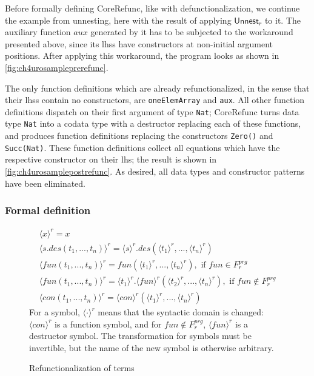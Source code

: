 Before formally defining \textsf{CoreRefunc}, like with defunctionalization, we continue the example from unnesting, here with the result of applying $\textsf{Unnest}_r$ to it. The auxiliary function $aux$ generated by it has to be subjected to the workaround presented above, since its lhss have constructors at non-initial argument positions. After applying this workaround, the program looks as shown in \autoref{fig:ch4urosampleprerefunc}.

The only function definitions which are already refunctionalized, in the sense that their lhss contain no constructors, are \texttt{oneElemArray} and \texttt{aux}. All other function definitions dispatch on their first argument of type \texttt{Nat}; \textsf{CoreRefunc} turns data type \texttt{Nat} into a codata type with a destructor replacing each of these functions, and produces function definitions replacing the constructors \texttt{Zero()} and \texttt{Succ(Nat)}. These function definitions collect all equations which have the respective constructor on their lhs; the result is shown in \autoref{fig:ch4urosamplepostrefunc}. As desired, all data types and constructor patterns have been eliminated.

\subsubsection{Formal definition}

\begin{figure}
\begin{align*}
\langle x \rangle^r = x \\
\langle s.des(t_1, ..., t_n) \rangle^r = \langle s \rangle^r .des(\langle t_1 \rangle^r, ..., \langle t_n \rangle^r) \\
\langle fun(t_1, ..., t_n) \rangle^r = fun(\langle t_1 \rangle^r, ..., \langle t_n \rangle^r), \text{ if } fun \in F^{prg}_r \\
\langle fun(t_1, ..., t_n) \rangle^r = \langle t_1 \rangle^r .\langle fun \rangle^r (\langle t_2 \rangle^r, ..., \langle t_n \rangle^r), \text{ if } fun \not\in F^{prg}_r \\
\langle con(t_1, ..., t_n) \rangle^r = \langle con \rangle^r (\langle t_1 \rangle^r, ..., \langle t_n \rangle^r)
\end{align*}
For a symbol, $\langle \cdot \rangle^r$ means that the syntactic domain is changed: $\langle con \rangle^r$ is a function symbol, and for $fun \not\in F^{prg}_r$, $\langle fun \rangle^r$ is a destructor symbol. The transformation for symbols must be invertible, but the name of the new symbol is otherwise arbitrary.
\caption{Refunctionalization of terms}
\label{fig:refuncterm}
\end{figure}

